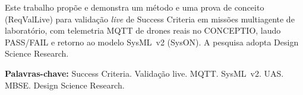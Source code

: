 Este trabalho propõe e demonstra um método e uma prova de conceito (ReqValLive)
para validação \emph{live} de Success Criteria em missões multiagente de laboratório,
com telemetria MQTT de drones reais no CONCEPTIO, laudo PASS/FAIL e retorno ao modelo
SysML~v2 (SysON). A pesquisa adopta Design Science Research.

\vspace{1em}
\noindent\textbf{Palavras-chave:} Success Criteria. Validação live. MQTT. SysML~v2. UAS. MBSE.
Design Science Research.

